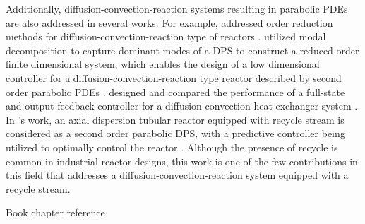Additionally, diffusion-convection-reaction systems resulting in parabolic PDEs are also addressed in several works. For example,  addressed order reduction methods for diffusion-convection-reaction type of reactors \autocite{Christofides2012book}.  utilized modal decomposition to capture dominant modes of a DPS to construct a reduced order finite dimensional system, which enables the design of a low dimensional controller for a diffusion-convection-reaction type reactor described by second order parabolic PDEs \autocite{dubljevic2006predictive2}.  designed and compared the performance of a full-state and output feedback controller for a diffusion-convection heat exchanger system \autocite{ozorio2019heat}. In 's work, an axial dispersion tubular reactor equipped with recycle stream is considered as a second order parabolic DPS, with a predictive controller being utilized to optimally control the reactor \autocite{khatibi2021model}.  Although the presence of recycle is common in industrial reactor designs, this work is one of the few contributions in this field that addresses a diffusion-convection-reaction system equipped with a recycle stream.


Book chapter reference \autocite{krstic2009book}


